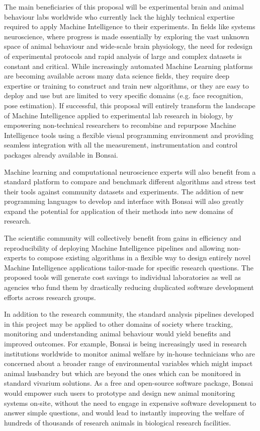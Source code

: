 The main beneficiaries of this proposal will be experimental brain and animal behaviour labs worldwide who currently lack the highly technical expertise required to apply Machine Intelligence to their experiments. In fields like systems neuroscience, where progress is made essentially by exploring the vast unknown space of animal behaviour and wide-scale brain physiology, the need for redesign of experimental protocols and rapid analysis of large and complex datasets is constant and critical. While increasingly automated Machine Learning platforms are becoming available across many data science fields, they require deep expertise or training to construct and train new algorithms, or they are easy to deploy and use but are limited to very specific domains (e.g. face recognition, pose estimation). If successful, this proposal will entirely transform the landscape of Machine Intelligence applied to experimental lab research in biology, by empowering non-technical researchers to recombine and repurpose Machine Intelligence tools using a flexible visual programming environment and providing seamless integration with all the measurement, instrumentation and control packages already available in Bonsai.

Machine learning and computational neuroscience experts will also benefit from a standard platform to compare and benchmark different algorithms and stress test their tools against community datasets and experiments. The addition of new programming languages to develop and interface with Bonsai will also greatly expand the potential for application of their methods into new domains of research.

The scientific community will collectively benefit from gains in efficiency and reproducibility of deploying Machine Intelligence pipelines and allowing non-experts to compose existing algorithms in a flexible way to design entirely novel Machine Intelligence applications tailor-made for specific research questions. The proposed tools will generate cost savings to individual laboratories as well as agencies who fund them by drastically reducing duplicated software development efforts across research groups.

In addition to the research community, the standard analysis pipelines developed in this project may be applied to other domains of society where tracking, monitoring and understanding animal behaviour would yield benefits and improved outcomes. For example, Bonsai is being increasingly used in research institutions worldwide to monitor animal welfare by in-house technicians who are concerned about a broader range of environmental variables which might impact animal husbandry but which are beyond the ones which can be monitored in standard vivarium solutions. As a free and open-source software package, Bonsai would empower such users to prototype and design new animal monitoring systems on-site, without the need to engage in expensive software development to answer simple questions, and would lead to instantly improving the welfare of hundreds of thousands of research animals in biological research facilities.


